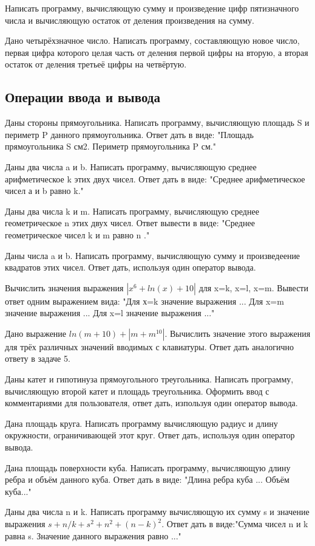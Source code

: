 \task Написать программу, вычисляющую сумму и произведение цифр
пятизначного числа и вычисляющую остаток от деления произведения на
сумму.

\task Дано четырёхзначное число. Написать программу, составляющую
новое число, первая цифра которого целая часть от деления первой цифры
на вторую, а вторая остаток от деления третьеё цифры на четвёртую.

\subsection{Операции ввода и вывода}

\task Даны стороны прямоугольника. Написать программу, вычисляющую
площадь S и периметр P данного прямоугольника. Ответ дать в виде:
"Площадь прямоугольника S см2. Периметр прямоугольника P см."

\task Даны два числа a и b. Написать программу, вычисляющую среднее
арифметическое k этих двух чисел. Ответ дать в виде: "Среднее
арифметическое чисел а и b равно k."

\task Даны два числа k и m. Написать программу, вычисляющую среднее
геометрическое n этих двух чисел. Ответ вывести в виде: "Среднее
геометрическое чисел k и m равно n ."

\task Даны числа a и b. Написать программу, вычисляющую сумму и
произведеение квадратов этих чисел. Ответ дать, используя один
оператор вывода.

\task Вычислить значения выражения $|x^6+ln(x)+10|$ для x=k, x=l,
x=m. Вывести ответ одним выражением вида: "Для х=k значение выражения
... Для x=m значение выражения ... Для x=l значение выражения ..."

\task Дано выражение $ln(m+10)+|m+m^10|$. Вычислить значение этого
выражения для трёх различных значений вводимых с клавиатуры. Ответ
дать аналогично ответу в задаче 5.

\task Даны катет и гипотинуза прямоугольного треугольника. Написать
программу, вычисляющую второй катет и площадь треугольника. Оформить
ввод с комментариями для пользователя, ответ дать, изпользуя один
оператор вывода.

\task Дана площадь круга. Написать программу вычисляющую радиус и
длину окружности, ограничивающей этот круг. Ответ дать, используя один
оператор вывода.

\task Дана площадь поверхности куба. Написать программу, вычисляющую
длину ребра и объём данного куба. Ответ дать в виде: "Длина ребра куба
... Объём куба..."

\task Даны два числа n и k. Написать программу вычисляющую их сумму s
и значение выражения $s+ n/k+s^2+n^2+(n-k)^2$. Ответ дать в
виде:"Сумма чисел n и k равна s. Значение данного выражения равно ..."
